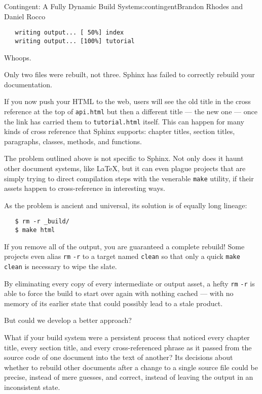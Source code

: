 \begin{aosachapter}{Contingent: A Fully Dynamic Build System}{s:contingent}{Brandon Rhodes and Daniel Rocco}
\begin{verbatim}
   writing output... [ 50%] index
   writing output... [100%] tutorial
\end{verbatim}

Whoops.

Only two files were rebuilt, not three. Sphinx has failed to correctly
rebuild your documentation.

If you now push your HTML to the web, users will see the old title in
the cross reference at the top of \texttt{api.html} but then a different
title --- the new one --- once the link has carried them to
\texttt{tutorial.html} itself. This can happen for many kinds of cross
reference that Sphinx supports: chapter titles, section titles,
paragraphs, classes, methods, and functions.

\label{build-systems-and-consistency}

The problem outlined above is not specific to Sphinx. Not only does it
haunt other document systems, like LaTeX, but it can even plague
projects that are simply trying to direct compilation steps with the
venerable \texttt{make} utility, if their assets happen to
cross-reference in interesting ways.

As the problem is ancient and universal, its solution is of equally long
lineage:

\begin{verbatim}
   $ rm -r _build/
   $ make html
\end{verbatim}

If you remove all of the output, you are guaranteed a complete rebuild!
Some projects even alias \texttt{rm} \texttt{-r} to a target named
\texttt{clean} so that only a quick \texttt{make} \texttt{clean} is
necessary to wipe the slate.

By eliminating every copy of every intermediate or output asset, a hefty
\texttt{rm} \texttt{-r} is able to force the build to start over again
with nothing cached --- with no memory of its earlier state that could
possibly lead to a stale product.

But could we develop a better approach?

What if your build system were a persistent process that noticed every
chapter title, every section title, and every cross-referenced phrase as
it passed from the source code of one document into the text of another?
Its decisions about whether to rebuild other documents after a change to
a single source file could be precise, instead of mere guesses, and
correct, instead of leaving the output in an inconsistent state.


\end{aosachapter}
